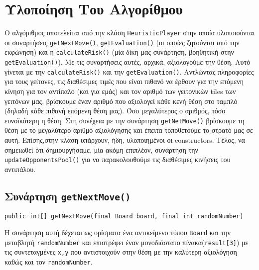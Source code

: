 \chapter{Υλοποίηση Του Αλγορίθμου}
\begin{sloppypar}
Ο αλγόριθμος αποτελείται από την κλάση \lstinline!HeuristicPlayer! στην οποία υλοποιούνται οι  
συναρτήσεις  \lstinline!getNextMove()!,
\lstinline!getEvaluation()! (οι οποίες ζητούνται από την εκφώνηση) και η 
\lstinline!calculateRisk()! (μία δίκη μας συνάρτηση, βοηθητική στην \lstinline!getEvaluation()!).
Με τις συναρτήσεις αυτές, αρχικά, αξιολογούμε την θέση.
Αυτό γίνεται με την \lstinline!calculateRisk()! και την 
\lstinline!getEvaluation()!.
Αντλώντας πληροφορίες για τους γείτονες, τις διαθέσιμες τιμές που είναι 
πιθανό να έρθουν για την επόμενη κίνηση  για τον αντίπαλο (και για εμάς) και τον αριθμό 
των γειτονικών tiles των γειτόνων μας,
βρίσκουμε έναν αριθμό που αξιολογεί κάθε κενή θέση στο ταμπλό
(δηλαδή κάθε πιθανή επόμενη θέση μας).
Όσο μεγαλύτερος ο αριθμός, τόσο ευνοϊκότερη η θέση.
Στη συνέχεια με την συνάρτηση \lstinline!getNetMove()! βρίσκουμε τη 
θέση με το μεγαλύτερο αριθμό αξιολόγησης και έπειτα τοποθετούμε το στρατό μας σε αυτή.
Επίσης,στην κλάση υπάρχουν, ήδη, υλοποιημένοι οι constructors.
Τέλος, να σημειωθεί ότι δημιουργήσαμε, μία ακόμη επιπλέον, συνάρτηση την \lstinline!updateOpponentsPool()! για να 
παρακολουθούμε τις διαθέσιμες κινήσεις του αντιπάλου.
\end{sloppypar}

\section{Συνάρτηση \lstinline[basicstyle=\ttfamily]!getNextMove()!}
\begin{lstlisting}[numbers=none, title={Declaration της συνάρτησης}]
public int[] getNextMove(final Board board, final int randomNumber)
\end{lstlisting}
Η συνάρτηση αυτή δέχεται ως ορίσματα ένα αντικείμενο τύπου \lstinline!Board! και 
την μεταβλητή \lstinline!randomNumber! και επιστρέφει έναν 
μονοδιάστατο πίνακα(\lstinline!result[3]!) με τις συντεταγμένες \lstinline!x,y! 
που αντιστοιχούν στην θέση με την καλύτερη αξιολόγηση καθώς και τον 
\lstinline!randomNumber!.

